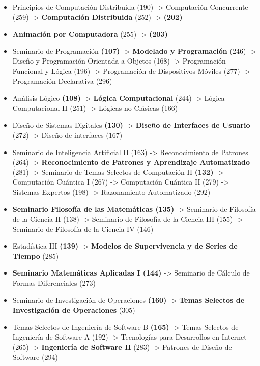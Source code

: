 \begin{appendices}
\begin{itemize}
  \item Principios de Computación Distribuida (190) -> Computación Concurrente (259) -> \textbf{Computación Distribuida} (252) -> \textbf{(202)}
  
  \item \textbf{Animación por Computadora} (255) -> \textbf{(203)}
  
  \item Seminario de Programación \textbf{(107)} -> \textbf{Modelado y Programación} (246) -> Diseño y Programación Orientada a Objetos (168) -> Programación Funcional y Lógica (196) -> Programación de Dispositivos Móviles (277) -> Programación Declarativa (296)
  
  \item Análisis Lógico \textbf{(108)} -> \textbf{Lógica Computacional} (244) -> Lógica Computacional II (251) -> Lógicas no Clásicas (166)
  
  \item Diseño de Sistemas Digitales \textbf{(130)} -> \textbf{Diseño de Interfaces de Usuario} (272) -> Diseño de interfaces (167)

  \item Seminario de Inteligencia Artificial II (163) -> Reconocimiento de Patrones (264) -> \textbf{Reconocimiento de Patrones y Aprendizaje Automatizado} (281) -> Seminario de Temas Selectos de Computación II \textbf{(132)} -> Computación Cuántica I (267) -> Computación Cuántica II (279) -> Sistemas Expertos (198) -> Razonamiento Automatizado (292)

  \item \textbf{Seminario Filosofía de las Matemáticas (135)} -> Seminario de Filosofía de la Ciencia II (138) -> Seminario de Filosofía de la Ciencia III (155) -> Seminario de Filosofía de la Ciencia IV (146)
  
  \item Estadística III \textbf{(139)} -> \textbf{Modelos de Supervivencia y de Series de Tiempo} (285)
    
  \item \textbf{Seminario Matemáticas Aplicadas I (144)} -> Seminario de Cálculo de Formas Diferenciales (273)
  
  \item Seminario de Investigación de Operaciones \textbf{(160)} -> \textbf{Temas Selectos de Investigación de Operaciones} (305)
  
  \item Temas Selectos de Ingeniería de Software B \textbf{(165)} -> Temas Selectos de Ingeniería de Software A (192) -> Tecnologías para Desarrollos en Internet (265) -> \textbf{Ingeniería de Software II} (283) -> Patrones de Diseño de Software (294)
  

\end{itemize}
\end{appendices}
